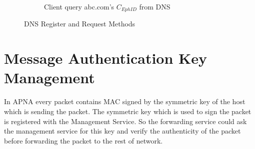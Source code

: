 \begin{figure}[th!]
\begin{subfigure}{.5\textwidth}
  \caption[DNS Request for a Domain]{Client query abc.com's $C_{EphID}$ from DNS}
  \label{fig:dns_request}
\end{subfigure}
\caption{DNS Register and Request Methods}
\label{fig:dns}
\end{figure}

\section{Message Authentication Key Management} \label{kms}
In APNA every packet contains MAC signed by the symmetric key of the host which is sending the packet. The symmetric key which is used to sign the packet is registered with the Management Service. So the forwarding service could ask the management service for this key and verify the authenticity of the packet before forwarding the packet to the rest of network.

